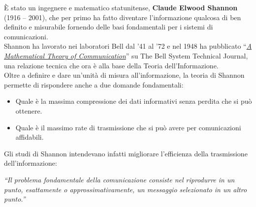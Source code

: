\`E stato un ingegnere e matematico statunitense, \textbf{Claude Elwood Shannon} (1916 – 2001), che per primo ha
fatto diventare l’informazione qualcosa di ben definito e misurabile fornendo delle basi fondamentali per i
sistemi di comunicazioni.\\
Shannon ha lavorato nei laboratori Bell dal ’41 al ’72 e nel 1948 ha pubblicato “\href{http://www.math.harvard.edu/~ctm/home/text/others/shannon/entropy/entropy.pdf}{\emph{A Mathematical Theory of Communication}}” su The Bell System Technical Journal, una relazione tecnica che ora è alla base della Teoria dell’Informazione. \\
Oltre a definire e dare un’unità di misura all’informazione, la teoria di Shannon permette di rispondere anche a due domande fondamentali:
\begin{itemize}
    \item Quale è la massima compressione dei dati informativi senza perdita che si può ottenere.
    \item Quale è il massimo rate di trasmissione che si può avere per comunicazioni affidabili.
\end{itemize}
Gli studi di Shannon intendevano infatti migliorare l'efficienza della trasmissione dell’informazione: 

\textit{“Il problema fondamentale della comunicazione consiste nel riprodurre in un punto, esattamente o
approssimativamente, un messaggio selezionato in un altro punto.”}


